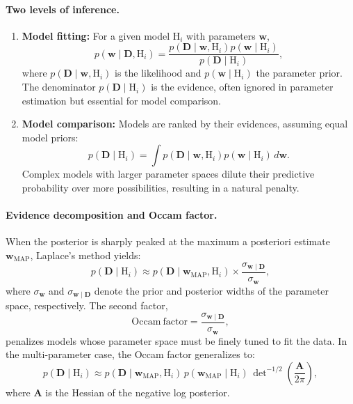 \paragraph{Two levels of inference.}
\begin{enumerate}
    \item \textbf{Model fitting:} For a given model $\mathrm{H}_i$ with
    parameters $\boldsymbol{w}$,
    \begin{equation}
    p(\boldsymbol{w} \mid \mathbf{D}, \mathrm{H}_i) =
    \frac{p(\mathbf{D} \mid \boldsymbol{w}, \mathrm{H}_i) p(\boldsymbol{w} \mid \mathrm{H}_i)}{p(\mathbf{D} \mid \mathrm{H}_i)},
    \end{equation}
    where $p(\mathbf{D}\mid \boldsymbol{w}, \mathrm{H}_i)$ is the likelihood and $p(\boldsymbol{w} \mid \mathrm{H}_i)$
    the parameter prior. The denominator $p(\mathbf{D} \mid \mathrm{H}_i)$ is the evidence, often
    ignored in parameter estimation but essential for model comparison.

    \item \textbf{Model comparison:} Models are ranked by their evidences,
    assuming equal model priors:
    \begin{equation}
    p(\mathbf{D} \mid \mathrm{H}_i) = \int p(\mathbf{D} \mid \boldsymbol{w}, \mathrm{H}_i) p(\boldsymbol{w} \mid \mathrm{H}_i) \, d\boldsymbol{w}.
    \end{equation}
    Complex models with larger parameter spaces dilute their predictive probability
    over more possibilities, resulting in a natural penalty.
\end{enumerate}

\paragraph{Evidence decomposition and Occam factor.}
When the posterior is sharply peaked at the maximum a posteriori estimate
$\boldsymbol{w}_{\mathrm{MAP}}$, Laplace's method yields:
\begin{equation}
p(\mathbf{D} \mid \mathrm{H}_i) \approx p(\mathbf{D} \mid \boldsymbol{w}_{\mathrm{MAP}}, \mathrm{H}_i) \times
\frac{\sigma_{\boldsymbol{w} \mid \mathbf{D}}}{\sigma_{\boldsymbol{w}}},
\end{equation}
where $\sigma_{\boldsymbol{w}}$ and $\sigma_{\boldsymbol{w} \mid \mathbf{D}}$ denote the prior and
posterior widths of the parameter space, respectively.
The second factor,
\begin{equation}
\mathrm{Occam\ factor} = \frac{\sigma_{\boldsymbol{w} \mid \mathbf{D}}}{\sigma_{\boldsymbol{w}}},
\end{equation}
penalizes models whose parameter space must be finely tuned to fit the data.
In the multi-parameter case, the Occam factor generalizes to:
\begin{equation}
p(\mathbf{D} \mid \mathrm{H}_i) \approx p(\mathbf{D} \mid \boldsymbol{w}_{\mathrm{MAP}}, \mathrm{H}_i) \,
p(\boldsymbol{w}_{\mathrm{MAP}} \mid \mathrm{H}_i) \,
\det\nolimits^{-1/2}\!\left(\frac{\mathbf{A}}{2\pi}\right),
\end{equation}
where $\mathbf{A}$ is the Hessian of the negative log posterior.

